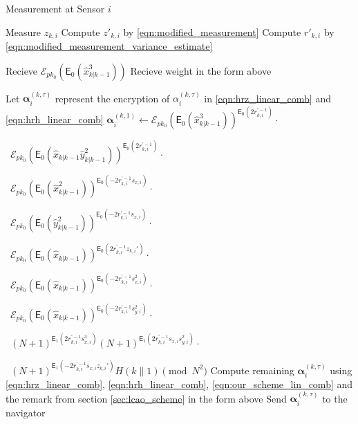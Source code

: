 \documentclass[10pt,letterpaper,oneside,twocolumn,journal]{IEEEtran}
\theoremstyle{definition}
\theoremstyle{definition}
\theoremstyle{remark}
\begin{document}
\begin{algorithm}[htbp]
\caption{Measurement at Sensor $i$}\label{alg:measurement_info}
\begin{algorithmic}[1]

    \State Measure $z_{k,i}$
    \State Compute $z'_{k,i}$ by \eqref{eqn:modified_measurement}
    \State Compute $r'_{k,i}$ by \eqref{eqn:modified_measurement_variance_estimate}

    \State Recieve $\mathcal{E}_{pk_0}(\mathsf{E}_{0}(\hat{x}^3_{k|k-1}))$
        \State Recieve weight in the form above
    \EndFor

    \State Let $\bm{\alpha}_{i}^{(k,\tau)}$ represent the encryption of $\alpha_{i}^{(k,\tau)}$ in \eqref{eqn:hrz_linear_comb} and \eqref{eqn:hrh_linear_comb}
    \State $\bm{\alpha}_{i}^{(k,1)} \gets \mathcal{E}_{pk_0}(\mathsf{E}_{0}(\hat{x}^3_{k|k-1}))^{\mathsf{E}_{0}(2r_{k,i}^{\prime-1})}\cdot$\par
    \ $\mathcal{E}_{pk_0}(\mathsf{E}_{0}(\hat{x}_{k|k-1}\hat{y}^2_{k|k-1}))^{\mathsf{E}_{0}(2r_{k,i}^{\prime-1})}\cdot$\par
    \ $\mathcal{E}_{pk_0}(\mathsf{E}_{0}(\hat{x}^2_{k|k-1}))^{\mathsf{E}_{0}(-2r_{k, i}^{\prime-1}s_{x,i})}\cdot$\par
    \ $\mathcal{E}_{pk_0}(\mathsf{E}_{0}(\hat{y}^2_{k|k-1}))^{\mathsf{E}_{0}(-2r_{k, i}^{\prime-1}s_{x,i})}\cdot$\par
    \ $\mathcal{E}_{pk_0}(\mathsf{E}_{0}(\hat{x}_{k|k-1}))^{\mathsf{E}_{0}(2r_{k,i}^{\prime-1}z_{k,i}')}\cdot$\par
    \ $\mathcal{E}_{pk_0}(\mathsf{E}_{0}(\hat{x}_{k|k-1}))^{\mathsf{E}_{0}(-2r_{k,i}^{\prime-1}s_{x,i}^2)}\cdot$\par
    \ $\mathcal{E}_{pk_0}(\mathsf{E}_{0}(\hat{x}_{k|k-1}))^{\mathsf{E}_{0}(-2r_{k,i}^{\prime-1}s_{y,i}^2)}\cdot$\par
    \ $(N+1)^{\mathsf{E}_{1}(2r_{k,i}^{\prime-1}s_{x,i}^3)}
    (N+1)^{\mathsf{E}_{1}(2r_{k,i}^{\prime-1}s_{x,i}s_{y,i}^2)}\cdot$\par
    \ $(N+1)^{\mathsf{E}_{1}(-2r_{k, i}^{\prime-1}s_{x,i}z_{k,i}')}
    H(k\mathbin\|1)\pmod{N^2}$
    \State Compute remaining $\bm{\alpha}_{i}^{(k,\tau)}$ using \eqref{eqn:hrz_linear_comb}, \eqref{eqn:hrh_linear_comb}, \eqref{eqn:our_scheme_lin_comb} and the remark from section \ref{sec:lcao_scheme} in the form above
        \State Send $\bm{\alpha}_{i}^{(k,\tau)}$ to the navigator
    \EndFor
    \EndProcedure
\end{algorithmic}
\end{algorithm}
\end{document}
